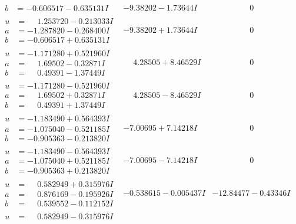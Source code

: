 \documentclass[1p]{elsarticle_modified}
\theoremstyle{definition}
\begin{document}
$$\begin{array}{c|c|c}
\begin{aligned}
b &= -0.606517 - 0.635131 I\end{aligned}
 & -9.38202 - 1.73644 I & \phantom{-0.000000 } 0 \\ \hline\begin{aligned}
u &= \phantom{-}1.253720 - 0.213033 I \\
a &= -1.287820 - 0.268400 I \\
b &= -0.606517 + 0.635131 I\end{aligned}
 & -9.38202 + 1.73644 I & \phantom{-0.000000 } 0 \\ \hline\begin{aligned}
u &= -1.171280 + 0.521960 I \\
a &= \phantom{-}1.69502 - 0.32871 I \\
b &= \phantom{-}0.49391 - 1.37449 I\end{aligned}
 & \phantom{-}4.28505 + 8.46529 I & \phantom{-0.000000 } 0 \\ \hline\begin{aligned}
u &= -1.171280 - 0.521960 I \\
a &= \phantom{-}1.69502 + 0.32871 I \\
b &= \phantom{-}0.49391 + 1.37449 I\end{aligned}
 & \phantom{-}4.28505 - 8.46529 I & \phantom{-0.000000 } 0 \\ \hline\begin{aligned}
u &= -1.183490 + 0.564393 I \\
a &= -1.075040 - 0.521185 I \\
b &= -0.905363 - 0.213820 I\end{aligned}
 & -7.00695 + 7.14218 I & \phantom{-0.000000 } 0 \\ \hline\begin{aligned}
u &= -1.183490 - 0.564393 I \\
a &= -1.075040 + 0.521185 I \\
b &= -0.905363 + 0.213820 I\end{aligned}
 & -7.00695 - 7.14218 I & \phantom{-0.000000 } 0 \\ \hline\begin{aligned}
u &= \phantom{-}0.582949 + 0.315976 I \\
a &= \phantom{-}0.876169 - 0.195926 I \\
b &= \phantom{-}0.539552 - 0.112152 I\end{aligned}
 & -0.538615 - 0.005437 I & -12.84477 - 0.43346 I \\ \hline\begin{aligned}
u &= \phantom{-}0.582949 - 0.315976 I \\

\end{aligned}
\end{array}$$
\end{document}
